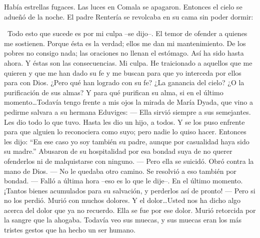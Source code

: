 
\begin{pages}
	\begin{Leftside}
		\beginnumbering
			Había estrellas fugaces. Las luces en Comala se apagaron.
		\pend
		\pstart
			Entonces el cielo se adueñó de la noche.
		\pend
		\pstart
			El padre Rentería se revolcaba en su cama sin poder dormir:

			\guillemotleft Todo esto que sucede es por mi culpa --se dijo--. El temor de ofender a quienes me sostienen. Porque ésta es la verdad; ellos me dan mi mantenimiento. De los pobres no consigo nada; las oraciones no llenan el estómago. Así ha sido hasta ahora. Y éstas son las consecuencias. Mi culpa. He traicionado a aquellos que me quieren y que me han dado su fe y me buscan para que yo interceda por ellos para con Dios. ¿Pero qué han logrado con su fe? ¿La ganancia del cielo? ¿O la purificación de sus almas? Y para qué purifican su alma, si en el último momento\ldots Todavía tengo frente a mis ojos la mirada de María Dyada, que vino a pedirme salvara a su hermana Eduviges:
		\pend
		\pstart
			\guillemotright --- Ella sirvió siempre a sus semejantes. Les dio todo lo que tuvo. Hasta les dio un hijo, a todos. Y se los puso enfrente para que alguien lo reconociera como suyo; pero nadie lo quiso hacer. Entonces les dijo: ``En ese caso yo soy también su padre, aunque por casualidad haya sido su madre.'' Abusaron de su hospitalidad por esa bondad suya de no querer ofenderlos ni de malquistarse con ninguno.
		\pend
		\pstart
			\guillemotright --- Pero ella se suicidó. Obró contra la mano de Dios.
		\pend
		\pstart
			\guillemotright --- No le quedaba otro camino. Se resolvió a eso también por bondad.
		\pend
		\pstart
			\guillemotright --- Falló a última hora --eso es lo que le dije--. En el último momento.
			¡Tantos bienes acumulados para su salvación, y perderlos así de pronto!
		\pend
		\pstart
			\guillemotright --- Pero si no los perdió. Murió con muchos dolores. Y el dolor\ldots Usted nos ha dicho algo acerca del dolor que ya no recuerdo. Ella se fue por ese dolor. Murió retorcida por la sangre que la ahogaba. Todavía veo sus muecas, y sus muecas eran los más tristes gestos que ha hecho un ser humano.

\end{Leftside}
\end{pages}
